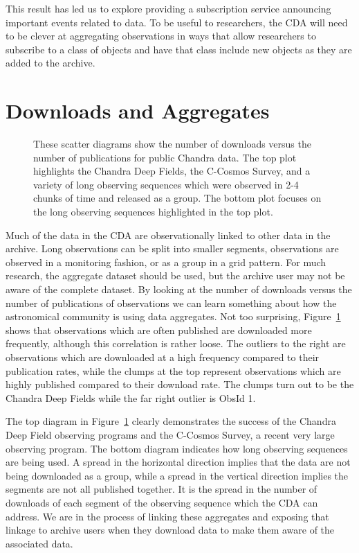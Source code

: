 This result has led us to explore providing a subscription service announcing important events related to data.  To be useful to researchers, the CDA will need to be clever at aggregating observations in ways that allow researchers to subscribe to a class of objects and have that class include new objects as they are added to the archive.

\section{Downloads and Aggregates}

\begin{figure}[ht]
\caption[DownloadsVsPubs]
 { \label{fig:DownloadsVsPubs}
These scatter diagrams show the number of downloads versus the number of publications for public Chandra data.  The top plot highlights the Chandra Deep Fields, the C-Cosmos Survey, and a variety of long observing sequences which were observed in 2-4 chunks of time and released as a group.  The bottom plot focuses on the long observing sequences highlighted in the top plot. }
\end{figure}

Much of the data in the CDA are observationally linked to other data in the archive.  Long observations can be split into smaller segments, observations are observed in a monitoring fashion, or as a group in a grid pattern.  For much research, the aggregate dataset should be used, but the archive user may not be aware of the complete dataset.  By looking at the number of downloads versus the number of publications of observations we can learn something about how the astronomical community is using data aggregates.  Not too surprising, Figure~\ref{fig:DownloadsVsPubs} shows that observations which are often published are downloaded more frequently, although this correlation is rather loose.  The outliers to the right are observations which are downloaded at a high frequency compared to their publication rates, while the clumps at the top represent observations which are highly published compared to their download rate.  The clumps turn out to be the Chandra Deep Fields while the far right outlier is ObsId 1. 

The top diagram in Figure~\ref{fig:DownloadsVsPubs} clearly demonstrates the success of the Chandra Deep Field observing programs and the C-Cosmos Survey, a recent very large observing program.  The bottom diagram indicates how long observing sequences are being used.  A spread in the horizontal direction implies that the data are not being downloaded as a group, while a spread in the vertical direction implies the segments are not all published together.  It is the spread in the number of downloads of each segment of the observing sequence which the CDA can address.  We are in the process of linking these aggregates and exposing that linkage to archive users when they download data to make them aware of the associated data.    

